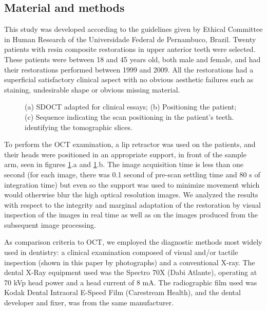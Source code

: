 \documentclass[12pt,twoside,english]{book}
\renewcommand{\~}{\perispomeni}%
\DeclareRobustCommand{\textgreek}[1]{\leavevmode{\greektext #1}}
\numberwithin{equation}{section}
\numberwithin{figure}{section}
\begin{document}
\subsection{Material and methods}

This study was developed according to the guidelines given by Ethical Committee in Human Research of the Universidade Federal de Pernambuco, Brazil. Twenty patients with resin composite restorations in upper anterior teeth were selected. These patients were between 18 and 45 years old, both male and female, and had their restorations performed between 1999 and 2009. All the restorations had a superficial satisfactory clinical aspect with no obvious aesthetic failures such as staining, undesirable shape or obvious missing material.
\begin{figure}[h]
\caption{(a) SDOCT adapted for clinical essays; (b) Positioning the patient; (c) Sequence indicating the scan positioning in the patient's teeth. identifying the tomographic slices.\label{fig:clinical photos}}
\end{figure}
 
To perform the OCT examination, a lip retractor was used on the patients, and their heads were positioned in an appropriate support, in front of the sample arm, seen in figures \ref{fig:clinical photos}.a and \ref{fig:clinical photos}.b. The image acquisition time is less than one second (for each image, there was 0.1 second of pre-scan settling time and 80 \textgreek{m}s of integration time) but even so the support was used to minimize movement which would otherwise blur the high optical resolution images. We analyzed the results with respect to the integrity and marginal adaptation of the restoration by visual inspection of the images in real time as well as on the images produced from the subsequent image processing.

As comparison criteria to OCT, we employed the diagnostic methods most widely used in dentistry: a clinical examination composed of visual and/or tactile inspection (shown in this paper by photographs) and a conventional X-ray. The dental X-Ray equipment used was the Spectro 70X (Dabi Atlante), operating at 70 kVp head power and a head current of 8 mA. The radiographic film used was Kodak Dental Intraoral E-Speed Film (Carestream Health), and the dental developer and fixer, was from the same manufacturer.
\end{document}
